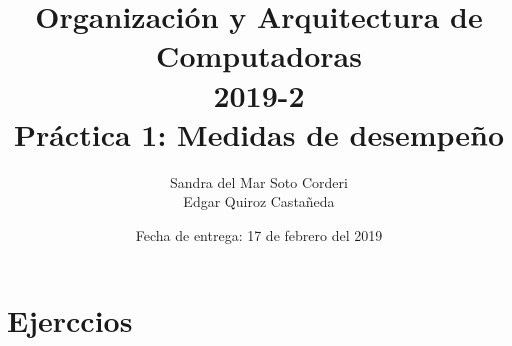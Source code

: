\documentclass{article}
\begin{document}
    
    \title{Organización y Arquitectura de Computadoras\\
    \large 2019-2 \\
    \large Práctica 1: Medidas de desempeño}

    \date{Fecha de entrega: 17 de febrero del 2019}

    \author{Sandra del Mar Soto Corderi\\
    Edgar Quiroz Castañeda}

    \maketitle



    \section{Ejerccios}
\end{document}
